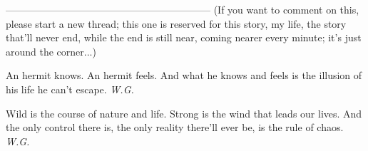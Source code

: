 --------------------------------------------------------------
(If you want to comment on this, please start a new thread; this one is reserved for this story, my life, the story that'll never end, while the end is still near, coming nearer every minute; it's just around the corner...)

An hermit 
knows. 
An hermit 
feels. 
And what he knows and feels 
is the illusion 
of his life 
he can't escape. 
\emph{W.G.}

Wild 
is the course of nature 
and life. 
Strong 
is the wind 
that leads our lives. 
And the only control there is, 
the only reality there'll ever be, 
is the rule of chaos. 
\emph{W.G.}

